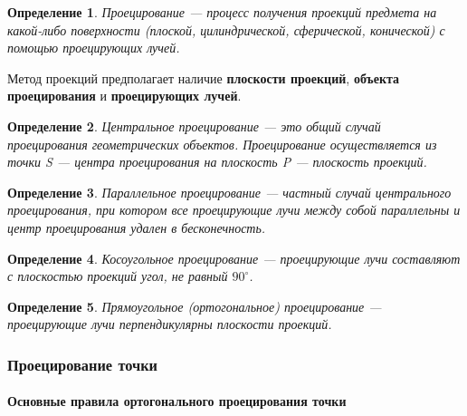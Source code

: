 \documentclass{article}
\newtheorem{definition}{Определение}
\begin{document}
\begin{flushleft}

\begin{definition}

Проецирование — процесс получения проекций предмета на какой-либо поверхности (плоской, цилиндрической, сферической, конической) с помощью проецирующих лучей.

\end{definition}

\hfill

Метод проекций предполагает наличие \textbf{плоскости проекций}, \textbf{объекта проецирования} и \textbf{проецирующих лучей}.

\begin{definition}

Центральное проецирование — это общий случай проецирования геометрических объектов. Проецирование осуществляется из точки S — центра проецирования на плоскость P — плоскость проекций.

\end{definition}

\begin{definition}

Параллельное проецирование — частный случай центрального проецирования, при котором все проецирующие лучи между собой параллельны и центр проецирования удален в бесконечность.

\end{definition}

\begin{definition}

Косоугольное проецирование — проецирующие лучи составляют с плоскостью проекций угол, не равный $90^{\circ}$.

\end{definition}

\begin{definition}

Прямоугольное (ортогональное) проецирование — проецирующие лучи перпендикулярны плоскости проекций.

\end{definition}

\subsubsection{Проецирование точки}

\paragraph{Основные правила ортогонального проецирования точки}


\end{flushleft}
\end{document}
